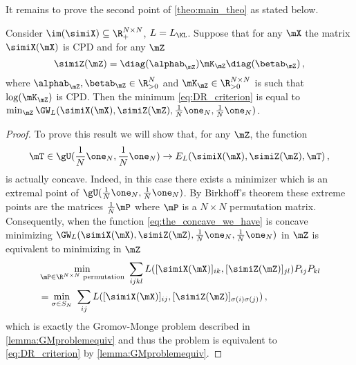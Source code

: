 It remains to prove the second point of \cref{theo:main_theo} as stated below.
\begin{proposition}
	\label{prop:second_point_theorem}
	Consider $\im(\simiX) \subseteq \R_+^{N \times N}$, $L = L_{\KL}$. Suppose that for any $\mX$ the matrix $\simiX(\mX)$ is CPD and for any $\mZ$ 
	\begin{equation}
		\simiZ(\mZ) = \diag(\alphab_\mZ) \mK_\mZ \diag(\betab_\mZ)\,,
	\end{equation}
	where $\alphab_\mZ, \betab_\mZ \in \R^{N}_{> 0}$ and  $\mK_\mZ \in \R^{N \times N}_{> 0}$ is such that $\log(\mK_\mZ)$ is CPD. Then the minimum \cref{eq:DR_criterion} is equal to $\min_{\mZ} \GW_L(\simiX(\mX), \simiZ(\mZ), \frac{1}{N}\one_N, \frac{1}{N}\one_N)$. 
\end{proposition}
\begin{proof}
	To prove this result we will show that, for any $\mZ$, the function
	\begin{equation}
		\label{eq:the_concave_we_have}
		\mT \in \gU(\frac{1}{N}\one_N, \frac{1}{N}\one_N) \to E_{L}(\simiX(\mX), \simiZ(\mZ), \mT)\,,
	\end{equation}
	is actually concave. Indeed, in this case  there exists a minimizer which is an extremal point of $\gU(\frac{1}{N}\one_N, \frac{1}{N}\one_N)$. By Birkhoff’s theorem \citep{birkhoff1946tres} these extreme points are the matrices $\frac{1}{N} \mP$ where $\mP$ is a $N \times N$ permutation matrix. Consequently, when the function \cref{eq:the_concave_we_have} is concave minimizing $\GW_L(\simiX(\mX), \simiZ(\mZ), \frac{1}{N}\one_N, \frac{1}{N}\one_N)$ in $\mZ$ is equivalent to minimizing in $\mZ$
	\begin{align}
		&\min_{\mP \in \R^{N \times N} \text{ permutation}} \ \sum_{ijkl} L([\simiX(\mX)]_{ik}, [\simiZ(\mZ)]_{jl}) P_{ij} P_{kl} \\
        &= \min_{\sigma \in S_N} \ \sum_{ij} L([\simiX(\mX)]_{ij}, [\simiZ(\mZ)]_{\sigma(i)\sigma(j)})\,,
	\end{align}
	which is exactly the Gromov-Monge problem described in \cref{lemma:GMproblemequiv} and thus the problem is equivalent to \cref{eq:DR_criterion} by \cref{lemma:GMproblemequiv}.
	

\end{proof}

